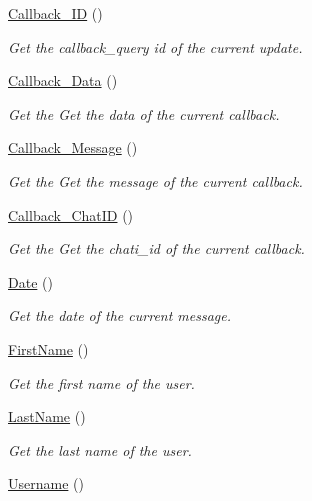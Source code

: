 \begin{DoxyCompactItemize}
\hyperlink{class_telegram_a61006cd19798be37ae51af5bc405ec71}{\-Callback\-\_\-\-I\-D} ()
\begin{DoxyCompactList}\small\item\em \-Get the callback\-\_\-query id of the current update. \end{DoxyCompactList}\item 
\hyperlink{class_telegram_a0df77a257a02ef572ca7d745f659e98d}{\-Callback\-\_\-\-Data} ()
\begin{DoxyCompactList}\small\item\em \-Get the \-Get the data of the current callback. \end{DoxyCompactList}\item 
\hyperlink{class_telegram_ad72a9632c75419625e9f194f400a31c9}{\-Callback\-\_\-\-Message} ()
\begin{DoxyCompactList}\small\item\em \-Get the \-Get the message of the current callback. \end{DoxyCompactList}\item 
\hyperlink{class_telegram_a848317ddda1c61f7173e55e0253b12e0}{\-Callback\-\_\-\-Chat\-I\-D} ()
\begin{DoxyCompactList}\small\item\em \-Get the \-Get the chati\-\_\-id of the current callback. \end{DoxyCompactList}\item 
\hyperlink{class_telegram_aff49fc2cda4491ff4457ca481bb8edf9}{\-Date} ()
\begin{DoxyCompactList}\small\item\em \-Get the date of the current message. \end{DoxyCompactList}\item 
\hypertarget{class_telegram_a0e3e32188dd1631ed1ed673ac844d999}{\hyperlink{class_telegram_a0e3e32188dd1631ed1ed673ac844d999}{\-First\-Name} ()}\label{class_telegram_a0e3e32188dd1631ed1ed673ac844d999}

\begin{DoxyCompactList}\small\item\em \-Get the first name of the user. \end{DoxyCompactList}\item 
\hypertarget{class_telegram_acf2c54b7fd06550cd64cf72194709a2c}{\hyperlink{class_telegram_acf2c54b7fd06550cd64cf72194709a2c}{\-Last\-Name} ()}\label{class_telegram_acf2c54b7fd06550cd64cf72194709a2c}

\begin{DoxyCompactList}\small\item\em \-Get the last name of the user. \end{DoxyCompactList}\item 
\hypertarget{class_telegram_a2521c81c6e75e23a361cc5a8a146f9c9}{\hyperlink{class_telegram_a2521c81c6e75e23a361cc5a8a146f9c9}{\-Username} ()}\label{class_telegram_a2521c81c6e75e23a361cc5a8a146f9c9}


\end{DoxyCompactItemize}
